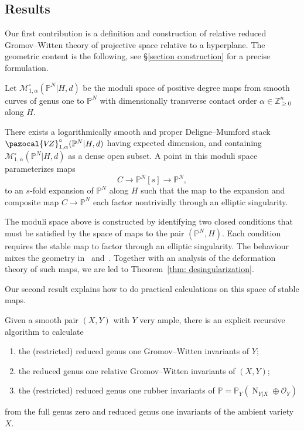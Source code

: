 \documentclass[11pt]{amsart}
\newcommand{\PP}{\mathbb P}
\newcommand{\VZ}{\pazocal{V\!Z}}
\newcommand{\OO}{\mathcal{O}}
\renewcommand{\to}{\rightarrow}
\theoremstyle{definition}
\newenvironment{customthm}[1]
  {\renewcommand\theinnercustomthm{#1}\innercustomthm}
  {\endinnercustomthm}
\theoremstyle{definition}
\begin{document}
\subsection{Results} Our first contribution is a definition and construction of relative reduced Gromov--Witten theory of projective space relative to a hyperplane. The geometric content is the following, see \S \ref{section construction} for a precise formulation.

Let $\mathcal M_{1,\alpha}^\circ(\mathbb P^N|H,d)$ be the moduli space of positive degree maps from smooth curves of genus one to $\mathbb P^N$ with dimensionally transverse contact order $\alpha\in\mathbb Z^n_{\geq 0}$ along $H$. 

\begin{customthm}{A}\label{thm: desingularization}
There exists a logarithmically smooth and proper Deligne--Mumford stack $\VZ_{1,\alpha}^\circ(\mathbb P^N|H,d)$ having expected dimension, and containing $\mathcal M_{1,\alpha}^\circ(\mathbb P^N|H,d)$  as a dense open subset. A point in this moduli space parameterizes maps
\[
C\to \mathbb P^N[s]\to \mathbb P^N,
\]
to an $s$-fold expansion of $\mathbb P^N$ along $H$ such that the map to the expansion and composite map $C\to \mathbb P^N$ each factor nontrivially through an elliptic singularity. 
\end{customthm}

The moduli space above is constructed by identifying two closed conditions that must be satisfied by the space of maps to the pair $(\mathbb P^N,H)$. Each condition requires the stable map to factor through an elliptic singularity. The behaviour mixes the geometry in~\cite{RSPW} and~\cite{RSPW2}. {Together with an analysis of the deformation theory of such maps, we are led to Theorem~\ref{thm: desingularization}}.

Our second result explains how to do practical calculations on this space of stable maps. 

\begin{customthm}{B}\label{thm: recursion}
Given a smooth pair $(X,Y)$ with $Y$ very ample, there is an explicit recursive algorithm to calculate
\begin{enumerate}
\item the (restricted) reduced genus one Gromov--Witten invariants of $Y$;
\item the reduced genus one relative Gromov--Witten invariants of $(X,Y)$; 
\item the (restricted) reduced genus one rubber invariants of $\mathbb{P}=\PP_Y(\operatorname{N}_{Y|X} \oplus \OO_Y)$
\end{enumerate}
from the full genus zero and reduced genus one invariants of the ambient variety $X$.
\end{customthm}
\end{document}
